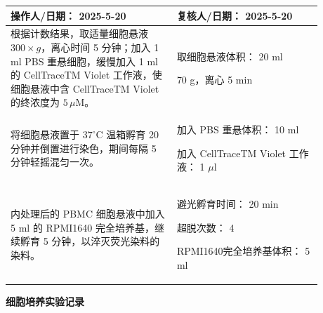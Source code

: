 \documentclass[UTF8,10pt,a4paper,fontset=fandol]{ctexart}
\newcommand{\fieldvalue}[1]{#1}
\newcommand{\handwritten}[1]{#1}
\begin{document}
\begin{tabular}{|p{0.47\linewidth}|p{0.41\linewidth}|}
\hline
操作人/日期：
\fieldvalue{\handwritten{2025-5-20}}
&
复核人/日期：
\fieldvalue{\handwritten{2025-5-20}}
\\ \hline
根据计数结果，取适量细胞悬液 $300\times g$，离心时间 5 分钟；加入 1 ml PBS 重悬细胞，缓慢加入 1 ml 的 CellTraceTM Violet 工作液，使细胞悬液中含 CellTraceTM Violet 的终浓度为 $5\,\mu\mathrm{M}$。
&
取细胞悬液体积：
\fieldvalue{\handwritten{20}} ml

\fieldvalue{\handwritten{70}} g，离心
\fieldvalue{\handwritten{5}} min
\\ \hline
将细胞悬液置于 $37^\circ\mathrm{C}$ 温箱孵育 20 分钟并倒置进行染色，期间每隔 5 分钟轻摇混匀一次。
&
加入 PBS 重悬体积：
\fieldvalue{\handwritten{10}} ml

加入 CellTraceTM Violet 工作液：
\fieldvalue{\handwritten{1}} \(\mu\mathrm{l}\)
\\ \hline
内处理后的 PBMC 细胞悬液中加入 5 ml 的 RPMI1640 完全培养基，继续孵育 5 分钟，以淬灭荧光染料的染料。
&
避光孵育时间：
\fieldvalue{\handwritten{20}} min

超脱次数：
\fieldvalue{\handwritten{4}}

RPMI1640完全培养基体积：
\fieldvalue{\handwritten{5}} ml
\\ \hline
\end{tabular}


\newpage

\begin{center}
\textbf{细胞培养实验记录}
\end{center}
\end{document}
